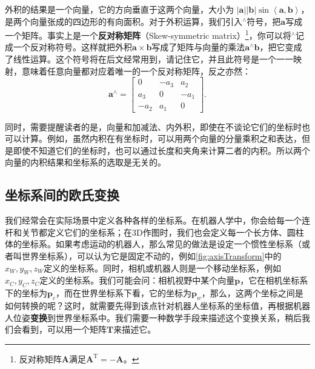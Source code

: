外积的结果是一个向量，它的方向垂直于这两个向量，大小为 $\left| \bm{a} \right|\left| \bm{b} \right|\sin \left\langle {\bm{a},\bm{b}} \right\rangle $，是两个向量张成的四边形的有向面积。对于外积运算，我们引入$^ \wedge$符号，把$\bm{a}$写成一个矩阵。事实上是一个\textbf{反对称矩阵}（Skew-symmetric matrix）\footnote{反对称矩阵$\bm{A}$满足$\bm{A}^\mathrm{T}=-\bm{A}$。}，你可以将$^ \wedge$记成一个反对称符号。这样就把外积$\bm{a} \times \bm{b}$写成了矩阵与向量的乘法${ \bm{a}^ \wedge } \bm{b}$，把它变成了线性运算。这个符号将在后文经常用到，请记住它，并且此符号是一个一一映射，意味着任意向量都对应着唯一的一个反对称矩阵，反之亦然：
\begin{equation}
\bm{a}^\wedge = \left[ {\begin{array}{*{20}{c}}
	0&{ - {a_3}}&{{a_2}}\\
	{{a_3}}&0&{ - {a_1}}\\
	{ - {a_2}}&{{a_1}}&0
	\end{array}} \right].
\end{equation}

同时，需要提醒读者的是，向量和加减法、内外积，即使在不谈论它们的坐标时也可以计算。例如，虽然内积在有坐标时，可以用两个向量的分量乘积之和表达，但是即使不知道它们的坐标时，也可以通过长度和夹角来计算二者的内积。所以两个向量的内积结果和坐标系的选取是无关的。

%
%
%

\subsection{坐标系间的欧氏变换}
我们经常会在实际场景中定义各种各样的坐标系。在机器人学中，你会给每一个连杆和关节都定义它们的坐标系；在3D作图时，我们也会定义每一个长方体、圆柱体的坐标系。如果考虑运动的机器人，那么常见的做法是设定一个惯性坐标系（或者叫世界坐标系），可以认为它是固定不动的，例如\autoref{fig:axisTransform}中的$x_W, y_W, z_W$定义的坐标系。同时，相机或机器人则是一个移动坐标系，例如$x_C, y_C, z_C$定义的坐标系。我们可能会问：相机视野中某个向量$\bm{p}$，它在相机坐标系下的坐标为$\bm{p}_c$，而在世界坐标系下看，它的坐标为$\bm{p}_w$，那么，这两个坐标之间是如何转换的呢？这时，就需要先得到该点针对机器人坐标系的坐标值，再根据机器人位姿\textbf{变换}到世界坐标系中。我们需要一种数学手段来描述这个变换关系，稍后我们会看到，可以用一个矩阵$\bm{T}$来描述它。

